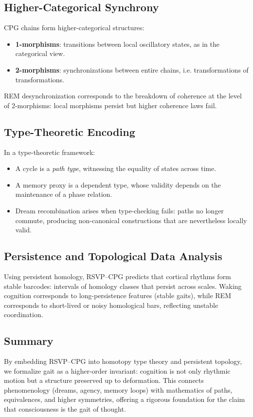 \documentclass{article}
\begin{document}
\subsection{Higher-Categorical Synchrony}
CPG chains form higher-categorical structures:  
\begin{itemize}
  \item \textbf{1-morphisms}: transitions between local oscillatory states, as in the categorical view.  
  \item \textbf{2-morphisms}: synchronizations between entire chains, i.e. transformations of transformations.  
\end{itemize}
REM desynchronization corresponds to the breakdown of coherence at the level of 2-morphisms: local morphisms persist but higher coherence laws fail.

\subsection{Type-Theoretic Encoding}
In a type-theoretic framework:
\begin{itemize}
  \item A cycle is a \emph{path type}, witnessing the equality of states across time.  
  \item A memory proxy is a dependent type, whose validity depends on the maintenance of a phase relation.  
  \item Dream recombination arises when type-checking fails: paths no longer commute, producing non-canonical constructions that are nevertheless locally valid.  
\end{itemize}

\subsection{Persistence and Topological Data Analysis}
Using persistent homology, RSVP--CPG predicts that cortical rhythms form stable barcodes: intervals of homology classes that persist across scales. Waking cognition corresponds to long-persistence features (stable gaits), while REM corresponds to short-lived or noisy homological bars, reflecting unstable coordination.

\subsection{Summary}
By embedding RSVP--CPG into homotopy type theory and persistent topology, we formalize gait as a higher-order invariant: cognition is not only rhythmic motion but a structure preserved up to deformation.  
This connects phenomenology (dreams, agency, memory loops) with mathematics of paths, equivalences, and higher symmetries, offering a rigorous foundation for the claim that consciousness is the gait of thought.
\end{document}
